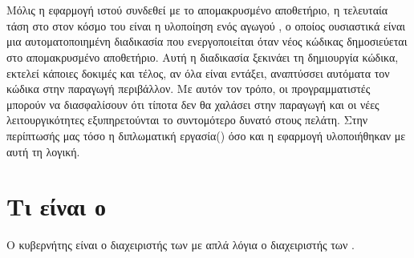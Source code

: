 \section{ }
Μόλις η εφαρμογή ιστού συνδεθεί με το απομακρυσμένο αποθετήριο, η τελευταία τάση στο
στον κόσμο του  είναι η υλοποίηση ενός αγωγού , ο οποίος ουσιαστικά
είναι μια αυτοματοποιημένη διαδικασία που ενεργοποιείται όταν νέος κώδικας δημοσιεύεται στο
απομακρυσμένο αποθετήριο. Αυτή η διαδικασία ξεκινάει τη δημιουργία κώδικα, εκτελεί κάποιες δοκιμές και
τέλος, αν όλα είναι εντάξει, αναπτύσσει αυτόματα τον κώδικα στην παραγωγή
περιβάλλον. Με αυτόν τον τρόπο, οι προγραμματιστές μπορούν να διασφαλίσουν ότι τίποτα δεν θα χαλάσει
στην παραγωγή και οι νέες λειτουργικότητες εξυπηρετούνται το συντομότερο δυνατό στους
πελάτη. Στην περίπτωσής μας τόσο η διπλωματική εργασία() όσο και η εφαρμογή υλοποιήθηκαν με αυτή τη λογική.


\section{Τι είναι ο  }
Ο κυβερνήτης είναι ο διαχειριστής των με απλά λόγια ο διαχειριστής των . 




